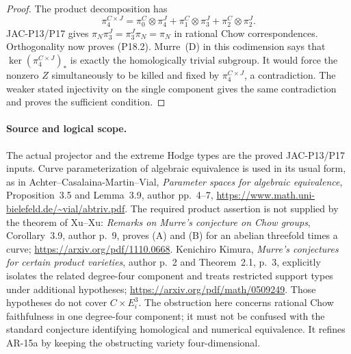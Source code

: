 \begin{proof}
The product decomposition has
\[
 \pi_4^{C\times J}
   =\pi_0^C\otimes\pi_4^J
      +\pi_1^C\otimes\pi_3^J
      +\pi_2^C\otimes\pi_2^J.
\]
JAC-P13/P17 gives
$\pi_N\pi_3^J=\pi_3^J\pi_N=\pi_N$ in rational Chow
correspondences. Orthogonality now proves (P18.2).
Murre~(D) in this codimension says that
$\ker(\pi_4^{C\times J})_*$ is exactly the homologically
trivial subgroup. It would force the nonzero $Z$ simultaneously
to be killed and fixed by $\pi_4^{C\times J}$, a contradiction.
The weaker stated injectivity on the single component gives the
same contradiction and proves the sufficient condition.
\end{proof}

\paragraph{Source and logical scope.}
The actual projector and the extreme Hodge types are the proved
JAC-P13/P17 inputs. Curve parameterization of algebraic
equivalence is used in its usual form, as in Achter--Casalaina-Martin--Vial,
\emph{Parameter spaces for algebraic equivalence},
Proposition~3.5 and Lemma~3.9, author pp.~4--7,
\url{https://www.math.uni-bielefeld.de/~vial/abtriv.pdf}.
The required product assertion is not supplied by the theorem of
Xu--Xu: \emph{Remarks on Murre's conjecture on Chow groups},
Corollary~3.9, author p.~9, proves (A) and (B) for an abelian
threefold times a curve;
\url{https://arxiv.org/pdf/1110.0668}.
Kenichiro Kimura, \emph{Murre's conjectures for certain product
varieties}, author p.~2 and Theorem~2.1, p.~3, explicitly isolates
the related degree-four component and treats restricted support
types under additional hypotheses;
\url{https://arxiv.org/pdf/math/0509249}.
Those hypotheses do not cover $C\times E_i^3$.
The obstruction here concerns rational Chow faithfulness in one
degree-four component; it must not be confused with the standard
conjecture identifying homological and numerical equivalence.
It refines AR-15a by keeping the obstructing variety four-dimensional.
